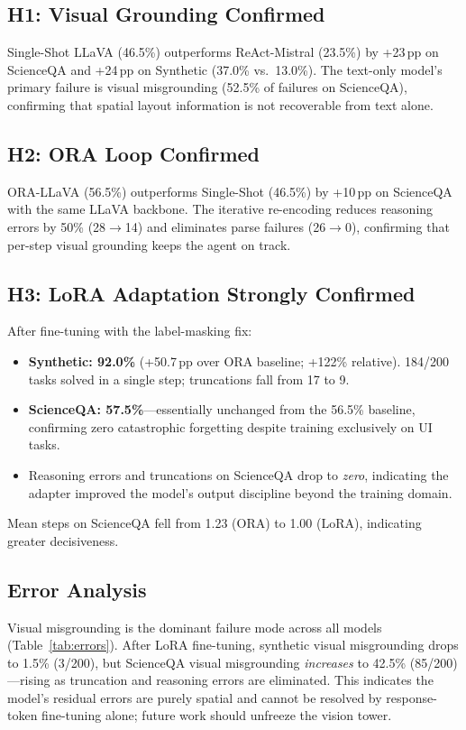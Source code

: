 \documentclass[10pt,twocolumn]{article}
\begin{document}
\subsection{H1: Visual Grounding Confirmed}

Single-Shot LLaVA (46.5\%) outperforms ReAct-Mistral (23.5\%) by +23\,pp on ScienceQA and
+24\,pp on Synthetic (37.0\% vs.\ 13.0\%). The text-only model's primary failure is visual
misgrounding (52.5\% of failures on ScienceQA), confirming that spatial layout information
is not recoverable from text alone.

\subsection{H2: ORA Loop Confirmed}

ORA-LLaVA (56.5\%) outperforms Single-Shot (46.5\%) by +10\,pp on ScienceQA with the same
LLaVA backbone. The iterative re-encoding reduces reasoning errors by 50\% (28$\to$14) and
eliminates parse failures (26$\to$0), confirming that per-step visual grounding keeps the
agent on track.

\subsection{H3: LoRA Adaptation Strongly Confirmed}

After fine-tuning with the label-masking fix:
\begin{itemize}
  \item \textbf{Synthetic: 92.0\%} (+50.7\,pp over ORA baseline; +122\% relative).
        184/200 tasks solved in a single step; truncations fall from 17 to 9.
  \item \textbf{ScienceQA: 57.5\%}---essentially unchanged from the 56.5\% baseline,
        confirming zero catastrophic forgetting despite training exclusively on UI tasks.
  \item Reasoning errors and truncations on ScienceQA drop to \emph{zero}, indicating
        the adapter improved the model's output discipline beyond the training domain.
\end{itemize}
Mean steps on ScienceQA fell from 1.23 (ORA) to 1.00 (LoRA), indicating greater decisiveness.

\subsection{Error Analysis}

Visual misgrounding is the dominant failure mode across all models (Table~\ref{tab:errors}).
After LoRA fine-tuning, synthetic visual misgrounding drops to 1.5\% (3/200), but ScienceQA
visual misgrounding \emph{increases} to 42.5\% (85/200)---rising as truncation and reasoning
errors are eliminated. This indicates the model's residual errors are purely spatial and cannot
be resolved by response-token fine-tuning alone; future work should unfreeze the vision tower.
\end{document}
